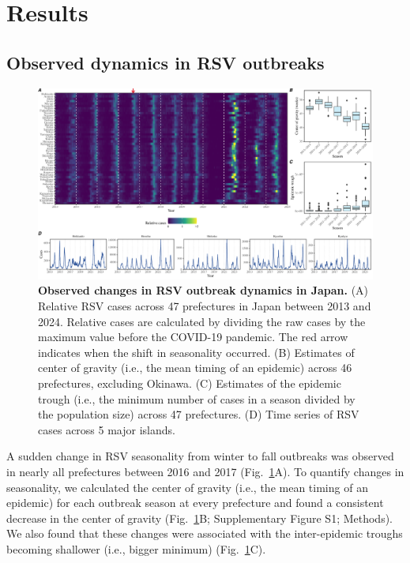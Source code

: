 \documentclass[12pt]{article}
\newcommand{\fref}[1]{Fig.~\ref{fig:#1}}
\begin{document}
\section*{Results}

\subsection*{Observed dynamics in RSV outbreaks}

\begin{figure}[!th]
\includegraphics[width=\textwidth]{../figure/figure1.pdf}
\caption{
\textbf{Observed changes in RSV outbreak dynamics in Japan.}
(A) Relative RSV cases across 47 prefectures in Japan between 2013 and 2024.
Relative cases are calculated by dividing the raw cases by the maximum value before the COVID-19 pandemic.
The red arrow indicates when the shift in seasonality occurred.
(B) Estimates of center of gravity (i.e., the mean timing of an epidemic) across 46 prefectures, excluding Okinawa.
(C) Estimates of the epidemic trough (i.e., the minimum number of cases in a season divided by the population size) across 47 prefectures.
(D) Time series of RSV cases across 5 major islands.
}
\label{fig:fig1}
\end{figure}

A sudden change in RSV seasonality from winter to fall outbreaks was observed in nearly all prefectures between 2016 and 2017 (\fref{fig1}A).
To quantify changes in seasonality, we calculated the center of gravity (i.e., the mean timing of an epidemic) for each outbreak season at every prefecture and found a consistent decrease in the center of gravity (\fref{fig1}B; Supplementary Figure S1; Methods).
We also found that these changes were associated with the inter-epidemic troughs becoming shallower (i.e., bigger minimum) (\fref{fig1}C).
\end{document}
